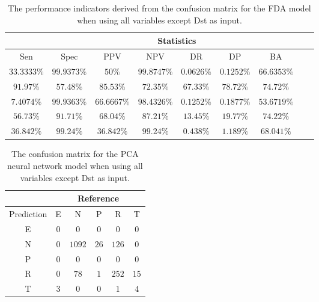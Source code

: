 \begin{table}[!ht]
	\centering
	\begin{tabular}{|c|c|c|c|c|c|c|c|c|}
		\hline
		 & \multicolumn{7}{c|}{Statistics} \\ \hline
		Sen & Spec & PPV & NPV & DR & DP & BA \\ \hline
		$33.3333\%$ & $99.9373\%$ & $50\%$ & $99.8747\%$ & $0.0626\%$ & $0.1252\%$ & $66.6353\%$ \\ \hline
		$91.97\%$ & $57.48\%$ & $85.53\%$ & $72.35\%$ & $67.33\%$ & $78.72\%$ & $74.72\%$ \\ \hline
		$7.4074\%$ & $99.9363\%$ & $66.6667\%$ & $98.4326\%$ & $0.1252\%$ & $0.1877\%$ & $53.6719\%$ \\ \hline
		$56.73\%$ & $91.71\%$ & $68.04\%$ & $87.21\%$ & $13.45\%$ & $19.77\%$ & $74.22\%$ \\ \hline
		$36.842\%$ & $99.24\%$ & $36.842\%$ & $99.24\%$ & $0.438\%$ & $1.189\%$ & $68.041\%$ \\ \hline
	\end{tabular}
	\caption{The performance indicators derived from the confusion matrix for the FDA model when using all variables except Dst as input.}
	\label{tab:cs:noDst:fda}
\end{table}

\begin{table}[!ht]
	\centering
	\begin{tabular}{|c|c|c|c|c|c|}
		\hline
		 & \multicolumn{5}{|c|}{Reference} \\ \hline
		 Prediction & E & N & P & R & T \\ \hline
		 E & $0$ & $0$ & $0$ & $0$ & $0$ \\ \hline
		 N & $0$ & $1092$ & $26$ & $126$ & $0$ \\ \hline
		 P & $0$ & $0$ & $0$ & $0$ & $0$ \\ \hline
		 R & $0$ & $78$ & $1$ & $252$ & $15$ \\ \hline
		 T & $3$ & $0$ & $0$ & $1$ & $4$ \\ \hline
	\end{tabular}
	\caption{The confusion matrix for the PCA neural network model when using all variables except Dst as input.}
	\label{tab:cm:noDst:pcaNNet}
\end{table}

